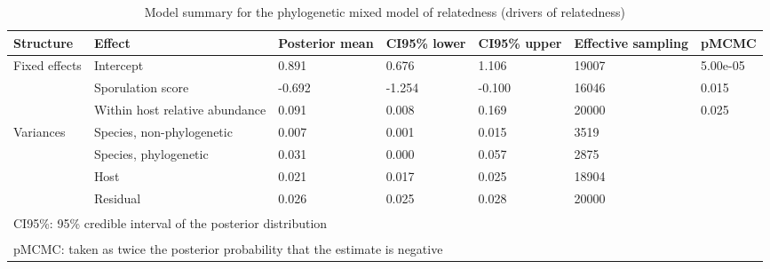 \begin{table}

\caption{\label{tab:}Model summary for the phylogenetic mixed model of relatedness (drivers of relatedness)}
\centering
\begin{tabular}[t]{lllllll}
\toprule
Structure & Effect & Posterior
 mean & CI95\% lower & CI95\% upper & Effective
 sampling & pMCMC\\
\midrule
Fixed effects & Intercept & 0.891 & 0.676 & 1.106 & 19007 & 5.00e-05\\
 & Sporulation score & -0.692 & -1.254 & -0.100 & 16046 & 0.015\\
 & Within host relative abundance & 0.091 & 0.008 & 0.169 & 20000 & 0.025\\
Variances & Species, non-phylogenetic & 0.007 & 0.001 & 0.015 & 3519 & \\
 & Species, phylogenetic & 0.031 & 0.000 & 0.057 & 2875 & \\
 & Host & 0.021 & 0.017 & 0.025 & 18904 & \\
 & Residual & 0.026 & 0.025 & 0.028 & 20000 & \\
\bottomrule
\multicolumn{7}{l}{\textsuperscript{} CI95\%: 95\% credible interval of the posterior distribution}\\
\multicolumn{7}{l}{\textsuperscript{} pMCMC: taken as twice the posterior probability that the estimate is negative}\\
\end{tabular}
\end{table}
